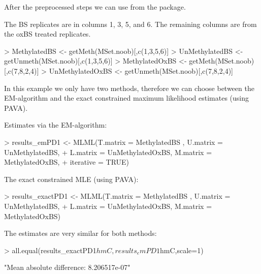 \documentclass{article}
\begin{document}
After the preprocessed steps we can use  from the  package.


The BS replicates are in columns 1, 3, 5, and 6. The remaining columns are from the oxBS treated replicates.

\begin{Schunk}
\begin{Sinput}
> MethylatedBS <- getMeth(MSet.noob)[,c(1,3,5,6)]
> UnMethylatedBS <- getUnmeth(MSet.noob)[,c(1,3,5,6)]
> MethylatedOxBS <- getMeth(MSet.noob)[,c(7,8,2,4)]
> UnMethylatedOxBS <- getUnmeth(MSet.noob)[,c(7,8,2,4)]
\end{Sinput}
\end{Schunk}





In this example we only have two methods, therefore we can choose between the EM-algorithm and the exact constrained maximum likelihood estimates (using PAVA).

Estimates via the EM-algorithm:

\begin{Schunk}
\begin{Sinput}
> results_emPD1 <- MLML(T.matrix = MethylatedBS , U.matrix = UnMethylatedBS,
+                    L.matrix = UnMethylatedOxBS, M.matrix = MethylatedOxBS,
+                    iterative = TRUE)
\end{Sinput}
\end{Schunk}




The exact constrained MLE (using PAVA):

\begin{Schunk}
\begin{Sinput}
> results_exactPD1 <- MLML(T.matrix = MethylatedBS , U.matrix = UnMethylatedBS,
+                       L.matrix = UnMethylatedOxBS, M.matrix = MethylatedOxBS)
\end{Sinput}
\end{Schunk}

The estimates are very similar for both methods:
\begin{Schunk}
\begin{Sinput}
> all.equal(results_exactPD1$hmC,results_emPD1$hmC,scale=1)
\end{Sinput}
\begin{Soutput}
[1] "Mean absolute difference: 8.206517e-07"
\end{Soutput}
\end{Schunk}
\end{document}

